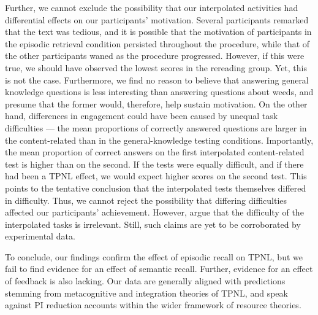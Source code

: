 \documentclass[../main.tex]{subfiles}
\begin{document}
Further, we cannot exclude the possibility that our interpolated activities 
had differential effects on our participants’ motivation. Several 
participants remarked that the text was tedious, and it is possible that the 
motivation of participants in the episodic retrieval condition persisted 
throughout the procedure, while that of the other participants waned as the 
procedure progressed. However, if this were true, we should have observed 
the lowest scores in the rereading group. Yet, this is not the case. 
Furthermore, we find no reason to believe that answering general knowledge 
questions is less interesting than answering questions about weeds, and 
presume that the former would, therefore, help sustain motivation. On the 
other hand, differences in engagement could have been caused by unequal task 
difficulties — the mean proportions of correctly answered questions are 
larger in the content-related than in the general-knowledge testing 
conditions. Importantly, the mean proportion of correct answers on the first 
interpolated content-related test is higher than on the second. If the tests 
were equally difficult, and if there had been a TPNL effect, we would expect 
higher scores on the second test. This points to the tentative conclusion 
that the interpolated tests themselves differed in difficulty. Thus, we 
cannot reject the possibility that differing difficulties affected our 
participants’ achievement. However, \citet{divisRetrievalSpeedsContext2014} 
argue that the difficulty of the interpolated tasks is irrelevant. Still, 
such claims are yet to be corroborated by experimental data.

To conclude, our findings confirm the effect of episodic recall on TPNL, but 
we fail to find evidence for an effect of semantic recall. Further, evidence 
for an effect of feedback is also lacking. Our data are generally aligned 
with predictions stemming from metacognitive and integration theories of 
TPNL, and speak against PI reduction accounts within the wider framework of 
resource theories.
\end{document}

